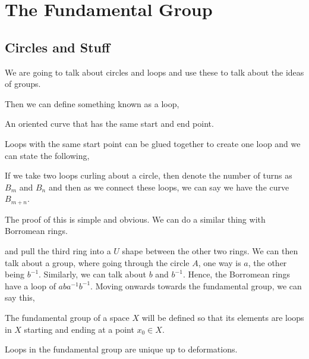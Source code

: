 
\section{The Fundamental Group}

\subsection{Circles and Stuff}
We are going to talk about circles and loops and use these to talk about the ideas of groups.
\begin{figure}[!ht]
  \centering
\end{figure}
Then we can define something known as a loop,
\begin{ndefi}[Loop]
  An oriented curve that has the same start and end point.
\end{ndefi}
Loops with the same start point can be glued together to create one loop and we can state the following,
\begin{nlemma}[]
  If we take two loops curling about a circle, then denote the number of turns as $B_m$ and $B_n$ and then as we connect these loops, we can say we have the curve $B_{m+n}$.
\end{nlemma}
The proof of this is simple and obvious. We can do a similar thing with Borromean rings.

\begin{figure}[!ht]
\centering
{}
\end{figure}
and pull the third ring into a $U$ shape between the other two rings. We can then talk about a group, where going through the circle $A$, one way is $a$, the other being $b^{-1}$. Similarly, we can talk about $b$ and $b^{-1}$. Hence, the Borromean rings have a loop of $aba^{-1}b^{-1}$. Moving onwards towards the fundamental group, we can say this,
\begin{intu}
  The fundamental group of a space $X$ will be defined so that its elements are loops in $X$ starting and ending at a point $x_0 \in X$.
\end{intu}
Loops in the fundamental group are unique up to deformations.


